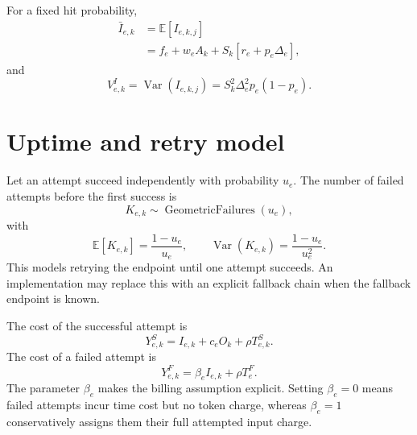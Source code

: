 \documentclass[11pt]{article}
\newcommand{\E}{\mathbb{E}}
\newcommand{\Var}{\operatorname{Var}}
\begin{document}
For a fixed hit probability,
\begin{align}
\bar I_{e,k}
&=\E[I_{e,k,j}] \\
&=f_e+w_eA_k+S_k\left[r_e+p_e\Delta_e\right],
\end{align}
and
\begin{equation}
V_{e,k}^I
=\Var(I_{e,k,j})
=S_k^2\Delta_e^2p_e(1-p_e).
\end{equation}

\section{Uptime and retry model}

Let an attempt succeed independently with probability $u_e$. The number of
failed attempts before the first success is
\begin{equation}
K_{e,k}\sim\operatorname{GeometricFailures}(u_e),
\end{equation}
with
\begin{equation}
\E[K_{e,k}]=\frac{1-u_e}{u_e},
\qquad
\Var(K_{e,k})=\frac{1-u_e}{u_e^2}.
\end{equation}
This models retrying the endpoint until one attempt succeeds. An implementation
may replace this with an explicit fallback chain when the fallback endpoint is
known.

The cost of the successful attempt is
\begin{equation}
Y_{e,k}^S=I_{e,k}+c_eO_k+\rho T_{e,k}^S.
\end{equation}
The cost of a failed attempt is
\begin{equation}
Y_{e,k}^F=\beta_e I_{e,k}+\rho T_e^F.
\end{equation}
The parameter $\beta_e$ makes the billing assumption explicit. Setting
$\beta_e=0$ means failed attempts incur time cost but no token charge, whereas
$\beta_e=1$ conservatively assigns them their full attempted input charge.
\end{document}

